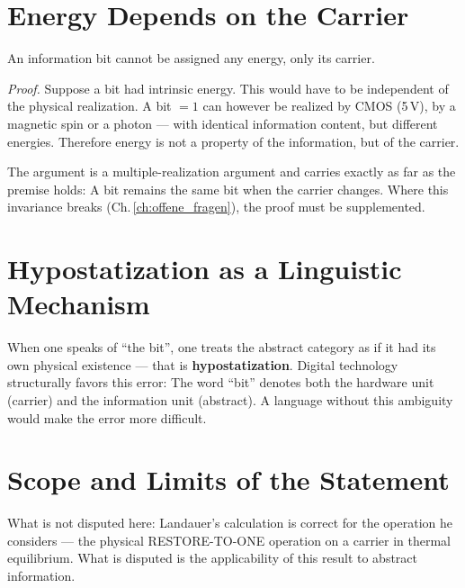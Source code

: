 \section{Energy Depends on the Carrier}

\begin{theorem}
An information bit cannot be assigned any energy, only its carrier.
\end{theorem}

\textit{Proof.} Suppose a bit had intrinsic energy. This would have to be
independent of the physical realization. A bit $= 1$ can however
be realized by CMOS (5\,V), by a magnetic spin or a photon
--- with identical information content, but different energies. Therefore
energy is not a property of the information, but of the carrier.

The argument is a multiple-realization argument and carries exactly as far
as the premise holds: A bit remains the same bit when the carrier changes.
Where this invariance breaks (Ch.\,\ref{ch:offene_fragen}), the proof
must be supplemented.

\section{Hypostatization as a Linguistic Mechanism}

When one speaks of \enquote{the bit}, one treats the abstract category
as if it had its own physical existence --- that is
\textbf{hypostatization}. Digital technology structurally favors this error:
The word \enquote{bit} denotes both the hardware unit (carrier) and
the information unit (abstract). A language without this ambiguity would make
the error more difficult.

\section{Scope and Limits of the Statement}

What is not disputed here: Landauer's calculation is correct for the
operation he considers --- the physical RESTORE-TO-ONE operation on
a carrier in thermal equilibrium. What is disputed is the applicability
of this result to abstract information.